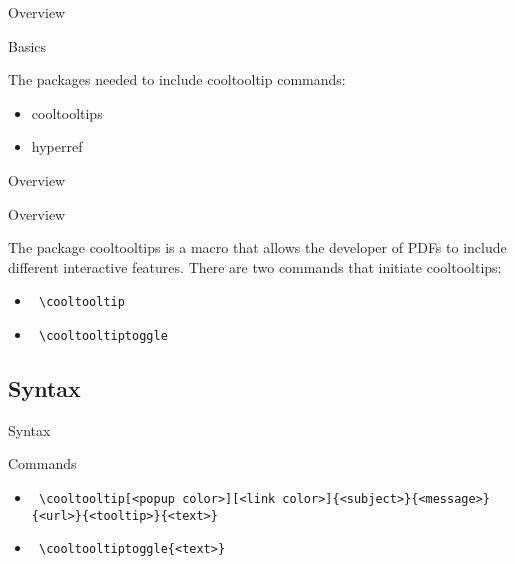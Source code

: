 \documentclass[article]{beamer}
\begin{document}
\begin{frame}[fragile]{Overview}

\begin{block}{Basics}

The packages needed to include cooltooltip commands:

\begin{itemize}
\item cooltooltips
\item hyperref
\end{itemize}

\end{block}

\end{frame}
\begin{frame}[fragile]{Overview}

\begin{block}{Overview}

The package cooltooltips is a macro that allows the developer of PDFs to include different interactive features. There are two commands that initiate cooltooltips:
\begin{itemize}
\item \verb! \cooltooltip!
\item \verb! \cooltooltiptoggle!
\end{itemize}

\end{block}

\end{frame}

\subsection{Syntax}

\begin{frame}[fragile]{Syntax}

\begin{block}{Commands}

\begin{itemize}
\item \verb! \cooltooltip[<popup color>][<link color>]{<subject>}{<message>}{<url>}{<tooltip>}{<text>}!
\item \verb! \cooltooltiptoggle{<text>}!
\end{itemize}

\end{block}

\end{frame}
\end{document}
